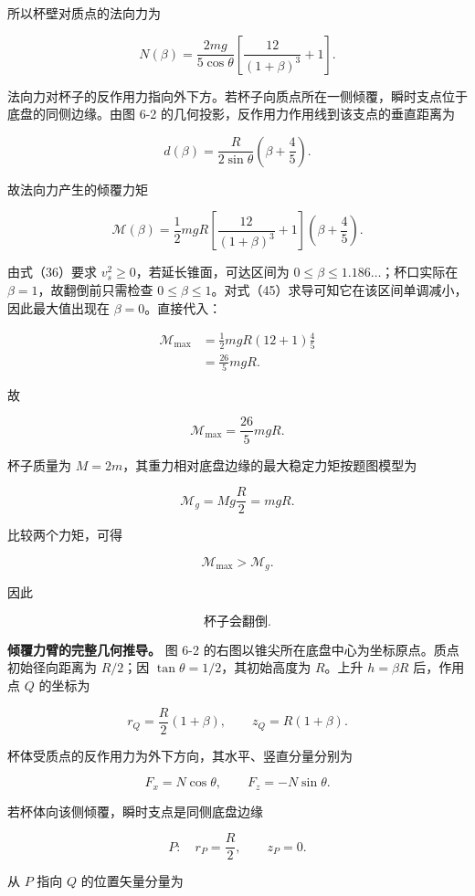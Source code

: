 \documentclass[12pt,a4paper,UTF8]{ctexart}
\begin{document}
所以杯壁对质点的法向力为

\[
\boxed{
N(\beta)
=\frac{2mg}{5\cos\theta}
\left[
\frac{12}{(1+\beta)^3}+1
\right]
}.
\tag{43}
\]

法向力对杯子的反作用力指向外下方。若杯子向质点所在一侧倾覆，瞬时支点位于底盘的同侧边缘。由图
6-2 的几何投影，反作用力作用线到该支点的垂直距离为

\[
d(\beta)
=\frac{R}{2\sin\theta}
\left(\beta+\frac45\right).
\tag{44}
\]

故法向力产生的倾覆力矩

\[
\mathcal M(\beta)
=\frac12mgR
\left[
\frac{12}{(1+\beta)^3}+1
\right]
\left(\beta+\frac45\right).
\tag{45}
\]

由式（36）要求 \(v_s^2\ge0\)，若延长锥面，可达区间为
\(0\le\beta\le1.186\ldots\)；杯口实际在 \(\beta=1\)，故翻倒前只需检查
\(0\le\beta\le1\)。对式（45）求导可知它在该区间单调减小，因此最大值出现在
\(\beta=0\)。直接代入：

\[
\begin{aligned}
\mathcal M_{\max}
&=\frac12mgR(12+1)\frac45\\
&=\frac{26}{5}mgR.
\end{aligned}
\tag{46}
\]

故

\[
\boxed{
\mathcal M_{\max}=\frac{26}{5}mgR
}.
\tag{47}
\]

杯子质量为 \(M=2m\)，其重力相对底盘边缘的最大稳定力矩按题图模型为

\[
\mathcal M_g=Mg\frac R2=mgR.
\tag{48}
\]

比较两个力矩，可得

\[
\mathcal M_{\max}>\mathcal M_g.
\tag{49}
\]

因此

\[
\boxed{\text{杯子会翻倒}}.
\tag{50}
\]

\textbf{倾覆力臂的完整几何推导。} 图 6-2
的右图以锥尖所在底盘中心为坐标原点。质点初始径向距离为 \(R/2\)；因
\(\tan\theta=1/2\)，其初始高度为 \(R\)。上升 \(h=\beta R\) 后，作用点
\(Q\) 的坐标为

\[
r_Q=\frac R2(1+\beta),
\qquad
z_Q=R(1+\beta).
\]

杯体受质点的反作用力为外下方向，其水平、竖直分量分别为

\[
F_x=N\cos\theta,
\qquad
F_z=-N\sin\theta.
\]

若杯体向该侧倾覆，瞬时支点是同侧底盘边缘

\[
P:\quad r_P=\frac R2,\qquad z_P=0.
\]

从 \(P\) 指向 \(Q\) 的位置矢量分量为
\end{document}
